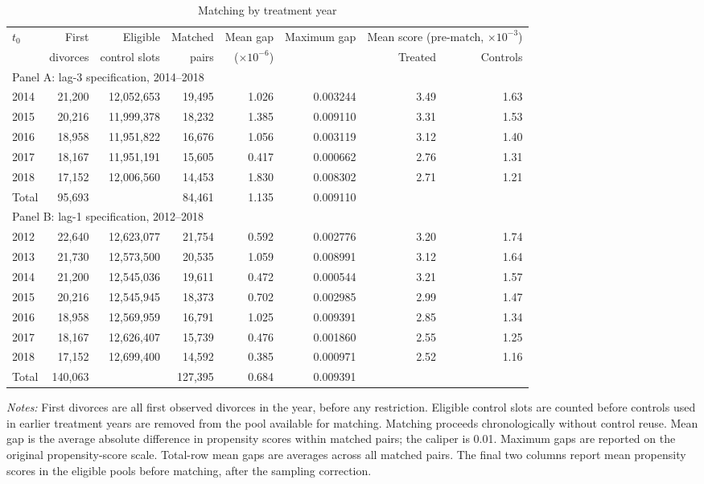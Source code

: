 \documentclass[a4paper,12pt]{article}
\theoremstyle{plain}
\theoremstyle{definition}
\theoremstyle{TheoremNum}
\theoremstyle{CorollaryNum}
\theoremstyle{PropositionNum}
\theoremstyle{TheoremNum}
\begin{document}
\begin{table}[H]
\centering
\footnotesize
\setlength{\tabcolsep}{1.5pt}
\renewcommand{\arraystretch}{1.15}
\begin{tabular*}{\textwidth}{@{}l@{\extracolsep{\fill}}rrrrrrr@{}}
\hline
$t_0$ & First & Eligible & Matched & Mean gap & Maximum gap
& \multicolumn{2}{c}{Mean score (pre-match, $\times 10^{-3}$)} \\
\cline{7-8}
& divorces & control slots & pairs & ($\times 10^{-6}$) & & Treated & Controls \\
\hline
\multicolumn{8}{l}{Panel A: lag-3 specification, 2014--2018} \\ \hline
2014 & 21,200 & 12,052,653 & 19,495 & 1.026 & 0.003244 & 3.49 & 1.63 \\
2015 & 20,216 & 11,999,378 & 18,232 & 1.385 & 0.009110 & 3.31 & 1.53 \\
2016 & 18,958 & 11,951,822 & 16,676 & 1.056 & 0.003119 & 3.12 & 1.40 \\
2017 & 18,167 & 11,951,191 & 15,605 & 0.417 & 0.000662 & 2.76 & 1.31 \\
2018 & 17,152 & 12,006,560 & 14,453 & 1.830 & 0.008302 & 2.71 & 1.21 \\ \hline
Total & 95,693 & & 84,461 & 1.135 & 0.009110 & & \\
\hline
\multicolumn{8}{l}{Panel B: lag-1 specification, 2012--2018} \\ \hline
2012 & 22,640 & 12,623,077 & 21,754 & 0.592 & 0.002776 & 3.20 & 1.74 \\
2013 & 21,730 & 12,573,500 & 20,535 & 1.059 & 0.008991 & 3.12 & 1.64 \\
2014 & 21,200 & 12,545,036 & 19,611 & 0.472 & 0.000544 & 3.21 & 1.57 \\
2015 & 20,216 & 12,545,945 & 18,373 & 0.702 & 0.002985 & 2.99 & 1.47 \\
2016 & 18,958 & 12,569,959 & 16,791 & 1.025 & 0.009391 & 2.85 & 1.34 \\
2017 & 18,167 & 12,626,407 & 15,739 & 0.476 & 0.001860 & 2.55 & 1.25 \\
2018 & 17,152 & 12,699,400 & 14,592 & 0.385 & 0.000971 & 2.52 & 1.16 \\ \hline
Total & 140,063 & & 127,395 & 0.684 & 0.009391 & & \\
\hline
\end{tabular*}
\caption{Matching by treatment year}
\label{tab:matching}
\vspace{3pt}

\begin{minipage}{\textwidth}
\footnotesize
\textit{Notes:} First divorces are all first observed divorces in the year, before any restriction. Eligible control slots are counted before controls used in earlier treatment years are removed from the pool available for matching. Matching proceeds chronologically without control reuse. Mean gap is the average absolute difference in propensity scores within matched pairs; the caliper is 0.01. Maximum gaps are reported on the original propensity-score scale. Total-row mean gaps are averages across all matched pairs. The final two columns report mean propensity scores in the eligible pools before matching, after the sampling correction.
\end{minipage}


\end{table}
\end{document}
